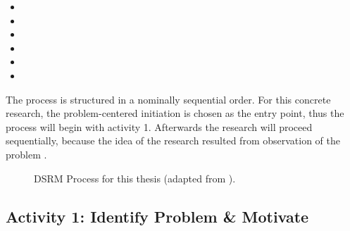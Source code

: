 \begin{itemize}
	\item {}
	\item {}
	\item {}
	\item {}
	\item {}
	\item {}
\end{itemize}

The process is structured in a nominally sequential order.
For this concrete research,
the problem-centered initiation is chosen as the entry point,
thus the process will begin with activity 1.
Afterwards the research will proceed sequentially,
because the idea of the research resulted from observation of the problem
\autocite{designScienceResearchMethodologyForInformationSystemsResearch}.
\bigskip


\begin{figure}[h]
	\centering
	\caption{DSRM Process for this thesis (adapted from \cite{designScienceResearchMethodologyForInformationSystemsResearch}).
	}
	\label{fig:dsrmProcessReleasePromotionGitOps}	
\end{figure}

\subsection{Activity 1: Identify Problem \& Motivate}
\label{methodology:activity1}

